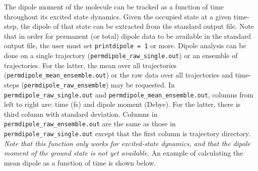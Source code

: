 \documentclass[letterpaper,12pt,titlepage]{article}
\begin{document}
The dipole moment of the molecule can be tracked as a function of time throughout its excited state dynamics.  Given the occupied state at a given time-step, the dipole of that state can be extracted from the standard output file.  Note that in order for permanent (or total) dipole data to be available in the standard output file, the user must set \verb+printdipole = 1+ or more.  Dipole analysis can be done on a single trajectory (\verb+permdipole_raw_single.out+) or an ensemble of trajectories.  For the latter, the mean over all trajectories (\verb+permdipole_mean_ensemble.out+) or the raw data over all trajectories and time-steps (\verb+permdipole_raw_ensemble+) may be requested.  In \verb+permdipole_raw_single.out+ and \verb+permdipole_mean_ensemble.out+, columns from left to right are: time (fs) and dipole moment (Debye).  For the latter, there is third column with standard deviation.  Columns in \verb+permdipole_raw_ensemble.out+ are the same as those in \verb+permdipole_raw_single.out+ except that the first column is trajectory directory.   {\textit{Note that this function only works for excited-state dynamics, and that the dipole moment of the ground state is not yet available.}}  An example of calculating the mean dipole as a function of time is shown below.
\end{document}
